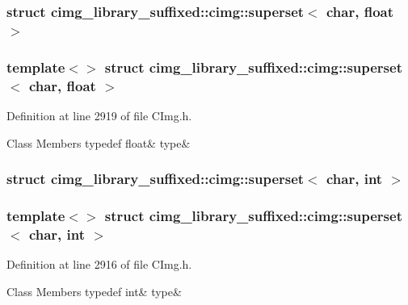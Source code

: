 \subsubsection{struct cimg\+\_\+library\+\_\+suffixed\+:\+:cimg\+:\+:superset$<$ char, float $>$}
\subsubsection*{template$<$$>$\newline
struct cimg\+\_\+library\+\_\+suffixed\+::cimg\+::superset$<$ char, float $>$}



Definition at line 2919 of file C\+Img.\+h.

\begin{DoxyFields}{Class Members}
\mbox{\label{namespacecimg__library__suffixed_1_1cimg_aa5e8ffc5af471d494b8a4609e2aa89b8}} 
typedef float&
type&
\\
\hline

\end{DoxyFields}
\label{structcimg__library__suffixed_1_1cimg_1_1superset_3_01char_00_01int_01_4}
\subsubsection{struct cimg\+\_\+library\+\_\+suffixed\+:\+:cimg\+:\+:superset$<$ char, int $>$}
\subsubsection*{template$<$$>$\newline
struct cimg\+\_\+library\+\_\+suffixed\+::cimg\+::superset$<$ char, int $>$}



Definition at line 2916 of file C\+Img.\+h.

\begin{DoxyFields}{Class Members}
\mbox{\label{namespacecimg__library__suffixed_1_1cimg_a2f2d753886028c69addbdf4b5480429b}} 
typedef int&
type&
\\
\hline

\end{DoxyFields}
\label{structcimg__library__suffixed_1_1cimg_1_1superset_3_01char_00_01short_01_4}
